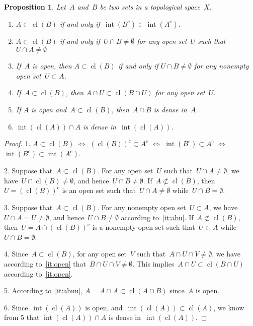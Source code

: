 \documentclass[11pt,a4paper]{article}
\newtheorem{proposition}{Proposition}[section]
\theoremstyle{definition}
\newcommand{\co}{{\mathrm{c}}}
\newcommand{\ie}{{i.e.}}
\DeclareMathOperator{\inter}{int}
\DeclareMathOperator{\cl}{cl}
\numberwithin{equation}{section}
\begin{document}
\begin{proposition}
  \label{prop:dense}
  Let~$A$ and~$B$ be two sets in a topological space~$X$. 
  \begin{enumerate}
    \item $A\subset \cl(B)$ if and only if~$\inter(B^\co ) \subset \inter(A^\co)$.
    \item \label{it:abu} $A \subset \cl(B)$ if and only if~$U\cap B \neq \emptyset$ for any open
      set~$U$ such that~$U \cap  A \neq \emptyset$ 
    \item \label{it:open} If~$A$ is open, then $A\subset \cl(B)$ if and only if $U\cap B \neq \emptyset$ for any
    nonempty open set~$U\subset A$.
  \item \label{it:abuu} If~$A\subset \cl(B)$, then $A\cap U \subset \cl(B\cap U)$ for any open set~$U$.
   \item \label{it:dense}If $A$ is open and~$A\subset \cl(B)$, then~$A\cap B$ is dense in~$A$.
   \item \label{it:intcl} $\inter(\cl(A))\cap A$ is dense in~$\inter(\cl(A))$.
  \end{enumerate}
\end{proposition}

\begin{proof}
1. $A\subset \cl(B)$ $\Leftrightarrow$ $(\cl(B))^\co \subset A^\co $ 
$\Leftrightarrow$ $\inter(B^\co)  \subset A^\co$
$\Leftrightarrow$ $\inter(B^\co)  \subset \inter(A^\co)$.

2. Suppose that~$A\subset \cl(B)$. For any open set~$U$ such that~$U\cap A\neq \emptyset$, we
   have~$U\cap \cl(B)\neq \emptyset$, and hence~$U\cap B\neq \emptyset$. 
   If~$A\not\subset \cl(B)$, then~$U=(\cl(B))^\co$ is an open set such that~$U\cap A \neq \emptyset$
   while~$U\cap B = \emptyset$. 

3. Suppose that~$A\subset \cl(B)$. For any nonempty open set~$U\subset A$, we have~$U\cap A = U\neq \emptyset$, 
and hence~$U\cap B\neq \emptyset$ according to~\ref{it:abu}. 
   If~$A\not\subset \cl(B)$, then~$U=A\cap (\cl(B))^\co$ is a nonempty open set such that~$U\subset A$  
   while~$U\cap B = \emptyset$. 

4. Since~$A \subset \cl(B)$, for any open set~$V$ such that~$A\cap U\cap V\neq \emptyset$, we have
according to~\ref{it:open} that~$B\cap U\cap V\neq \emptyset$. This implies~$A\cap U \subset \cl(B\cap U)$
according to~\ref{it:open}.

5. According to~\ref{it:abuu}, $A = A\cap A \subset \cl(A\cap B)$ since~$A$ is open.

6. Since~$\inter(\cl(A))$ is open, and~$\inter(\cl(A)) \subset \cl(A)$, we know from 5 that 
$\inter(\cl(A))\cap A$ is dense in~$\inter(\cl(A))$. 
\end{proof}
\end{document}
